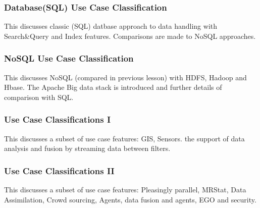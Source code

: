 


\subsubsection{Database(SQL) Use Case
Classification}\label{databasesql-use-case-classification}

This discusses classic (SQL) datbase approach to data handling with
Search\&Query and Index features. Comparisons are made to NoSQL
approaches.




\subsubsection{NoSQL Use Case
Classification}\label{nosql-use-case-classification}

This discusses NoSQL (compared in previous lesson) with HDFS, Hadoop and
Hbase. The Apache Big data stack is introduced and further details of
comparison with SQL.




\subsubsection{Use Case Classifications
I}\label{use-case-classifications-i}

This discusses a subset of use case features: GIS, Sensors. the support
of data analysis and fusion by streaming data between filters.





\subsubsection{Use Case Classifications
II}\label{use-case-classifications-ii}

This discusses a subset of use case features: Pleasingly parallel,
MRStat, Data Assimilation, Crowd sourcing, Agents, data fusion and
agents, EGO and security.





